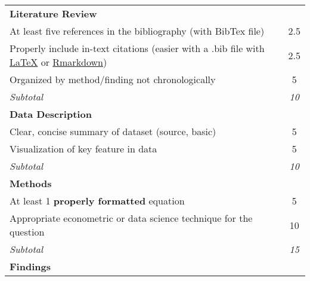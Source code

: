 \documentclass[12pt,english]{article}
\begin{document}
\begin{center}
{\begin{tabular}{l|c|c}
\hline
\textbf{Literature Review}                                                                   &               &                          \\
At least five references in the bibliography (with BibTex file)                              &               & 2.5                       \\
Properly include in-text citations (easier with a .bib file with \href{https://www.overleaf.com/learn/latex/Bibliography_management_with_bibtex}{LaTeX} or \href{https://bookdown.org/fmcron/Rhodes-template/bibliographies.html}{Rmarkdown})                     &               & 2.5                        \\
Organized by method/finding not chronologically                                              &               & 5                       \\
\hline
\textit{Subtotal}                                                                            &               & \textit{10}              \\
\hline
\textbf{Data Description}                                                                    &               &                          \\
Clear, concise summary of dataset (source, basic)                                            &               & 5                       \\
Visualization of key feature in data                                                         &               & 5                        \\
\hline
\textit{Subtotal}                                                                            &               & \textit{10}              \\
\hline
\textbf{Methods}                                                                        &               &                          \\
At least 1 \textbf{properly formatted} equation                                              &               & 5                        \\
Appropriate econometric or data science technique for the question                           &               & 10                       \\
\hline
\textit{Subtotal}                                                                            &               & \textit{15}              \\
\hline
\textbf{Findings}                                                                         &               &                          \\

\end{tabular}}
\end{center}
\end{document}
